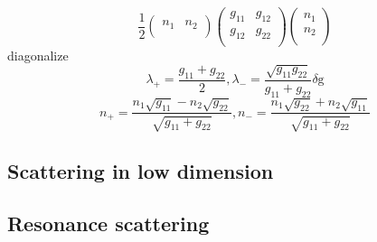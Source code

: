 \begin{equation}
\frac{1}{2}\left(
\begin{array}{cc}
 n_1 & n_2 \\
\end{array}
\right)\left(
\begin{array}{cc}
 g_{11} & g_{12} \\
 g_{12} & g_{22} \\
\end{array}
\right)\left(
\begin{array}{c}
 n_1 \\
 n_2 \\
\end{array}
\right)
\end{equation}
diagonalize
\begin{equation}
\lambda _+=\frac{g_{11}+g_{22}}{2},\lambda_-=\frac{\sqrt{g_{11}g_{22}}}{g_{11}+g_{22}}\text{$\delta $g}
\end{equation}
\begin{equation}
n_+=\frac{n_1\sqrt{g_{11}}-n_2\sqrt{g_{22}}}{\sqrt{g_{11}+g_{22}}}, n_-=\frac{n_1\sqrt{g_{22}}+n_2\sqrt{g_{11}}}{\sqrt{g_{11}+g_{22}}}
\end{equation}

\subsection{Scattering in low dimension}
\subsection{Resonance scattering}







